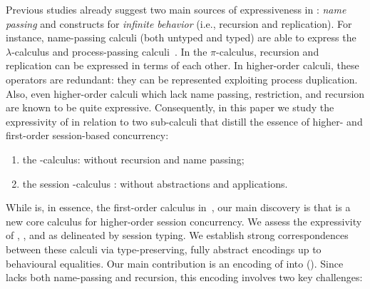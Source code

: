 Previous studies already suggest two main sources 
of expressiveness in \HOp: \emph{name passing} and constructs for \emph{infinite behavior} (i.e., recursion and replication). 
For instance, name-passing calculi (both untyped and typed) are able to express the $\lambda$-calculus and 
process-passing calculi~\cite{SangiorgiD:expmpa}. In the $\pi$-calculus, recursion and replication can be expressed in terms of each other. 
In higher-order calculi,
these operators are redundant: they can be represented exploiting process duplication. 
Also, even higher-order calculi which lack name passing, restriction, and recursion are known to be quite expressive.
Consequently, 
in this paper we study the expressivity of \HOp in relation to two  sub-calculi
that distill the essence of higher- and first-order session-based concurrency:
\begin{enumerate}[-]
\item the \HO-calculus: \HOp without recursion and name passing;
\item the session \sessp-calculus : \HOp without abstractions and applications.  
\end{enumerate}
While \sessp is, 
in essence, the first-order calculus in~\cite{honda.vasconcelos.kubo:language-primitives}, 
our main discovery is 
that \HO  is a new core calculus 
for higher-order session concurrency.
We assess the expressivity 
 of \HOp, \HO, and \sessp as delineated by session typing. 
We establish strong correspondences between 
these calculi  via type-preserving, fully abstract encodings up to 
behavioural equalities. 
Our main contribution is 
an encoding of \HOp into \HO ().  
Since \HO lacks 
both name-passing and recursion, this encoding involves two key challenges:
